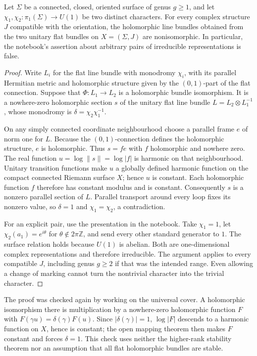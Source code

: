 \begin{proposition}\ours{}
Let \(\Sigma\) be a connected, closed, oriented surface of genus \(g\geq1\),
and let \(\chi_1,\chi_2:\pi_1(\Sigma)\to U(1)\) be two distinct characters.
For every complex structure \(J\) compatible with the orientation, the
holomorphic line bundles obtained from the two unitary flat bundles on
\(X=(\Sigma,J)\) are nonisomorphic.  In particular, the notebook's assertion
about arbitrary pairs of irreducible representations is false.
\end{proposition}

\begin{proof}
Write \(L_i\) for the flat line bundle with monodromy \(\chi_i\), with its
parallel Hermitian metric and holomorphic structure given by the
\((0,1)\)-part of the flat connection.  Suppose that
\(\Phi:L_1\to L_2\) is a holomorphic bundle isomorphism.  It is a nowhere-zero
holomorphic section \(s\) of the unitary flat line bundle
\(L=L_2\otimes L_1^{-1}\), whose monodromy is
\(\delta=\chi_2\chi_1^{-1}\).

On any simply connected coordinate neighbourhood choose a parallel frame
\(e\) of norm one for \(L\).  Because the \((0,1)\)-connection defines the
holomorphic structure, \(e\) is holomorphic.  Thus \(s=f e\) with \(f\)
holomorphic and nowhere zero.  The real function
\(u=\log\lVert s\rVert=\log|f|\) is harmonic on that neighbourhood.  Unitary
transition functions make \(u\) a globally defined harmonic function on the
compact connected Riemann surface \(X\); hence \(u\) is constant.  Each
holomorphic function \(f\) therefore has constant modulus and is constant.
Consequently \(s\) is a nonzero parallel section of \(L\).  Parallel
transport around every loop fixes its nonzero value, so \(\delta=1\) and
\(\chi_1=\chi_2\), a contradiction.

For an explicit pair, use the presentation in the notebook.  Take
\(\chi_1=1\), let \(\chi_2(a_1)=e^{i\theta}\) for
\(\theta\notin2\pi\mathbb Z\), and send every other standard generator to
\(1\).  The surface relation holds because \(U(1)\) is abelian.  Both are
one-dimensional complex representations and therefore irreducible.  The
argument applies to every compatible \(J\), including genus \(g\geq2\)
if that was the intended range.  Even allowing a change of marking cannot
turn the nontrivial character into the trivial character.
\end{proof}

\begin{remark}
The proof was checked again by working on the universal cover.  A
holomorphic isomorphism there is multiplication by a nowhere-zero
holomorphic function \(F\) with
\(F(\gamma u)=\delta(\gamma)F(u)\).  Since \(|\delta(\gamma)|=1\),
\(\log|F|\) descends to a harmonic function on \(X\), hence is constant;
the open mapping theorem then makes \(F\) constant and forces
\(\delta=1\).  This check uses neither the higher-rank stability theorem
nor an assumption that all flat holomorphic bundles are stable.
\end{remark}


